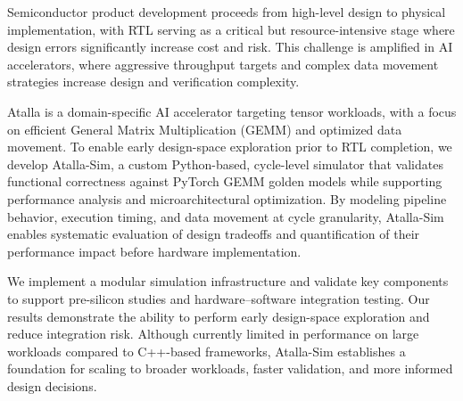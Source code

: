 Semiconductor product development proceeds from high-level design to physical implementation, with RTL serving as a critical but resource-intensive stage where design errors significantly increase cost and risk. This challenge is amplified in AI accelerators, where aggressive throughput targets and complex data movement strategies increase design and verification complexity.

Atalla is a domain-specific AI accelerator targeting tensor workloads, with a focus on efficient General Matrix Multiplication (GEMM) and optimized data movement. To enable early design-space exploration prior to RTL completion, we develop Atalla-Sim, a custom Python-based, cycle-level simulator that validates functional correctness against PyTorch GEMM golden models while supporting performance analysis and microarchitectural optimization. By modeling pipeline behavior, execution timing, and data movement at cycle granularity, Atalla-Sim enables systematic evaluation of design tradeoffs and quantification of their performance impact before hardware implementation.

We implement a modular simulation infrastructure and validate key components to support pre-silicon studies and hardware–software integration testing. Our results demonstrate the ability to perform early design-space exploration and reduce integration risk. Although currently limited in performance on large workloads compared to C++-based frameworks, Atalla-Sim establishes a foundation for scaling to broader workloads, faster validation, and more informed design decisions.
